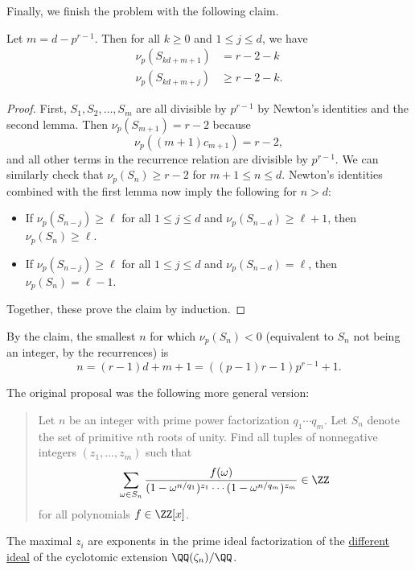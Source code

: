 \documentclass[11pt]{scrartcl}
\begin{document}
Finally, we finish the problem with the following claim.
\begin{claim*}
  Let $m=d-p^{r-1}$. Then for all $k\geq 0$ and $1\leq j\leq d$, we have
  \begin{align*}
    \nu_p(S_{kd+m+1}) &= r-2-k \\
    \nu_p(S_{kd+m+j}) &\geq r-2-k.
  \end{align*}
\end{claim*}

\begin{proof}
  First, $S_1, S_2, \dots, S_m$ are all divisible by $p^{r - 1}$ by Newton's
  identities and the second lemma. Then $\nu_p(S_{m + 1}) = r - 2$ because
  \[\nu_p((m+1)c_{m+1})=r-2,\]
  and all other terms in the recurrence relation are divisible by $p^{r-1}$. We
  can similarly check that $\nu_p(S_{n})\geq r-2$ for $m+1\leq n \leq d$.
  Newton's identities combined with the first lemma now imply
  the following for $n > d$:
  \begin{itemize}
    \item If $\nu_p(S_{n-j})\geq \ell$ for all $1\leq j\leq d$ and
      $\nu_p(S_{n-d})\geq \ell+1$, then $\nu_p(S_{n})\geq \ell$.
    \item If $\nu_p(S_{n-j})\geq \ell$ for all $1\leq j\leq d$ and
      $\nu_p(S_{n-d})=\ell$, then $\nu_p(S_{n})=\ell-1$.
  \end{itemize}
  Together, these prove the claim by induction.
\end{proof}
By the claim, the smallest $n$ for which $\nu_p(S_n) < 0$ (equivalent to $S_n$
not being an integer, by the recurrences) is
\[n=(r-1)d+m+1=((p-1)r-1)p^{r-1}+1.\]

\begin{remark*}
  The original proposal was the following more general version:
  \begin{quote}
    Let $n$ be an integer with prime power factorization $q_1\dotsm q_m$.
    Let $S_n$ denote the set of primitive $n$th roots of unity. Find all tuples of nonnegative integers $(z_1,\dots,z_m)$ such that
    \[
      \sum_{\omega\in S_n} \frac{f(\omega)}{(1-\omega^{n/q_1})^{z_1}\dotsm (1-\omega^{n/q_m})^{z_m}} \in \ZZ
    \]
    for all polynomials $f\in \ZZ[x]$.
  \end{quote}
  The maximal $z_i$ are exponents in the prime ideal factorization of the \href{https://en.wikipedia.org/wiki/Different_ideal}{different ideal} of the cyclotomic extension $\QQ(\zeta_n)/\QQ$.
\end{remark*}
\end{document}
